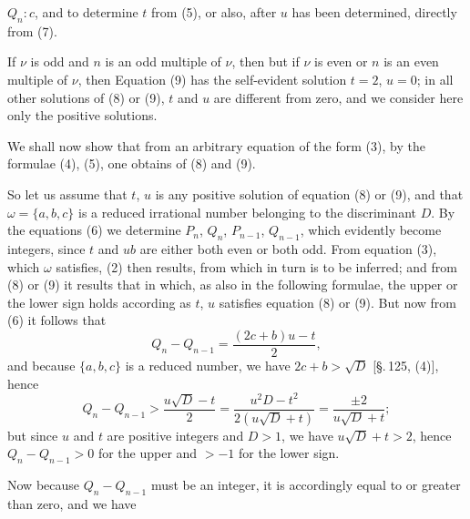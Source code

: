 $Q_n : c$, and to determine $t$ from (5), or also, after $u$ has
been determined, directly from (7).

If $\nu$ is odd and $n$ is an odd multiple of $\nu$, then
but if $\nu$ is even or $n$ is an even multiple of $\nu$, then
Equation (9) has the self-evident solution $t = 2$,
$u = 0$; in all other solutions of (8) or (9), $t$ and
$u$ are different from zero, and we consider here only the positive
solutions.

We shall now show that from an arbitrary
equation of the form (3), by the formulae (4), (5), one obtains  of (8) and (9).

So let us assume that $t$, $u$ is any positive solution
of equation (8) or (9), and that $\omega = \{a, b, c\}$ is a reduced irrational number belonging to the discriminant $D$. By the equations (6) we determine $P_n$, $Q_n$, $P_{n-1}$, $Q_{n-1}$, which evidently become
integers, since $t$ and $u b$ are either both even or both
odd. From equation (3), which $\omega$ satisfies, (2) then results,
from which in turn
is to be inferred; and from (8) or (9) it results that
in which, as also in the following formulae, the upper or the
lower sign holds according as $t$, $u$ satisfies equation (8) or (9).
But now from (6) it follows that
\[
Q_n - Q_{n-1} = \frac{(2 c + b) u - t}{2},
\]
and because $\{a, b, c\}$ is a reduced number, we have $2 c + b > \sqrt{D}$
[\S.\,125, (4)], hence
\[
Q_n - Q_{n-1} > \frac{u \sqrt{D} - t}{2} = \frac{u^2 D - t^2}{2(u \sqrt{D} + t)} = \frac{\pm 2}{u \sqrt{D} + t};
\]
but since $u$ and $t$ are positive integers and $D > 1$, we have
$u \sqrt{D} + t > 2$, hence $Q_n - Q_{n-1} > 0$ for the upper and $> -1$
for the lower sign.

Now because $Q_n - Q_{n-1}$ must be an integer, it is
accordingly equal to or greater than zero, and we have
